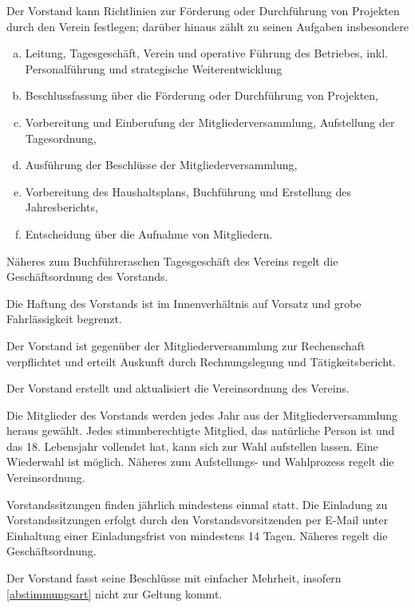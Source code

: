 \begin{contract}
    Der Vorstand kann Richtlinien zur Förderung oder Durchführung von Projekten durch den Verein festlegen; darüber hinaus zählt zu seinen Aufgaben insbesondere
    \begin{enumerate}[(a)]
        \item Leitung, Tagesgeschäft, Verein und operative Führung des Betriebes, inkl. Personalführung und strategische Weiterentwicklung
        \item Beschlussfassung über die Förderung oder Durchführung von Projekten,
        \item Vorbereitung und Einberufung der Mitgliederversammlung, Aufstellung der Tagesordnung,
        \item Ausführung der Beschlüsse der Mitgliederversammlung,
        \item Vorbereitung des Haushaltsplans, Buchführung und Erstellung des Jahresberichts,
        \item Entscheidung über die Aufnahme von Mitgliedern.
    \end{enumerate}
    Näheres zum Buchführeraschen Tagesgeschäft des Vereins regelt die Geschäftsordnung des Vorstands.

    Die Haftung des Vorstands ist im Innenverhältnis auf Vorsatz und grobe Fahrlässigkeit begrenzt.

    Der Vorstand ist gegenüber der Mitgliederversammlung zur Rechenschaft verpflichtet und erteilt Auskunft durch Rechnungslegung und Tätigkeitsbericht.

    Der Vorstand erstellt und aktualisiert die Vereinsordnung des Vereins.


    Die Mitglieder des Vorstands werden jedes Jahr aus der Mitgliederversammlung heraus
    gewählt. Jedes stimmberechtigte Mitglied, das natürliche Person ist und das 18. Lebensjahr
    vollendet hat, kann sich zur Wahl aufstellen lassen. Eine Wiederwahl ist möglich. Näheres zum Aufstellungs- und Wahlprozess regelt die Vereinsordnung.

    Vorstandssitzungen finden jährlich mindestens einmal statt. Die Einladung zu Vorstandssitzungen erfolgt durch den Vorstandsvorsitzenden per E-Mail unter Einhaltung einer Einladungsfrist von mindestens 14 Tagen. Näheres regelt die Geschäftsordnung.

    Der Vorstand fasst seine Beschlüsse mit einfacher Mehrheit, insofern \ref{abstimmungsart} nicht zur Geltung kommt.


\end{contract}
